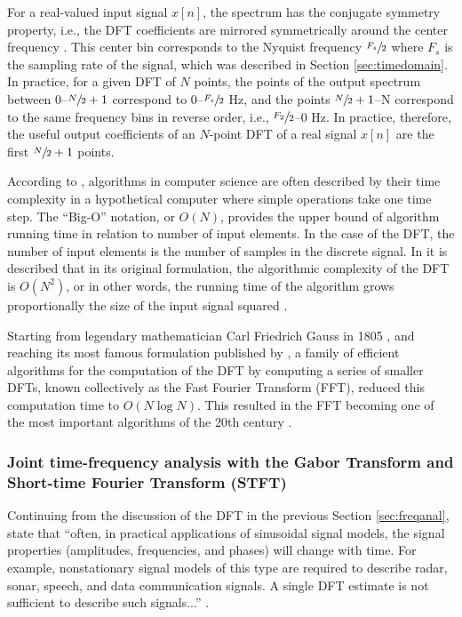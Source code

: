 \documentclass[report.tex]{subfiles}
\begin{document}
For a real-valued input signal $x[n]$, the spectrum has the conjugate symmetry property, i.e., the DFT coefficients are mirrored symmetrically around the center frequency \parencite{dspfirst}. This center bin corresponds to the Nyquist frequency $\sfrac{F_{s}}{2}$ where $F_{s}$ is the sampling rate of the signal, which was described in Section \ref{sec:timedomain}. In practice, for a given DFT of $N$ points, the points of the output spectrum between 0--$\sfrac{N}{2}+1$ correspond to 0--$\sfrac{F_{s}}{2}$ Hz, and the points $\sfrac{N}{2}+1$--N correspond to the same frequency bins in reverse order, i.e., $\sfrac{F_{2}}{2}$--0 Hz. In practice, therefore, the useful output coefficients of an $N$-point DFT of a real signal $x[n]$ are the first $\sfrac{N}{2}+1$ points.

According to \textcite{skiena}, algorithms in computer science are often described by their time complexity in a hypothetical computer where simple operations take one time step. The ``Big-O'' notation, or $O(N)$, provides the upper bound of algorithm running time in relation to number of input elements. In the case of the DFT, the number of input elements is the number of samples in the discrete signal. In \textcite[Chapter~9]{discretebook} it is described that in its original formulation, the algorithmic complexity of the DFT is $O(N^{2})$, or in other words, the running time of the algorithm grows proportionally the size of the input signal squared \parencite{skiena}. 

Starting from legendary mathematician Carl Friedrich Gauss in 1805 \parencite{gausshist}, and reaching its most famous formulation published by \textcite{cooleytukey}, a family of efficient algorithms for the computation of the DFT by computing a series of smaller DFTs, known collectively as the Fast Fourier Transform (FFT), reduced this computation time to $O(N \log{N})$. This resulted in the FFT becoming one of the most important algorithms of the 20th century \parencite{ffttopten}.

\newpagefill

\subsubsection{Joint time-frequency analysis with the Gabor Transform and Short-time Fourier Transform (STFT)}
\label{sec:jointtfa}

Continuing from the discussion of the DFT in the previous Section \ref{sec:freqanal},\citeauthor{discretebook} state that ``often, in practical applications of sinusoidal signal models, the signal properties (amplitudes, frequencies, and phases) will change with time. For example, nonstationary signal models of this type are required to describe radar, sonar, speech, and data communication signals. A single DFT estimate is not sufficient to describe such signals...'' \parencite[714]{discretebook}.
\end{document}
